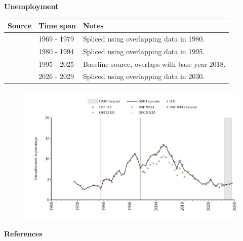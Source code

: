 \documentclass[12pt,a4paper,landscape]{article}
\begin{document}
\begin{adjustbox}{max totalsize={\paperwidth}{\paperheight},center}
\begin{minipage}[t][\textheight][t]{\textwidth}
\vspace*{0.5cm}
{}
\begin{center}
{\Large\bfseries Unemployment}
\end{center}
\vspace{0.5cm}
\begin{table}[H]
\centering
\small
\begin{tabular}{|l|l|l|}
\hline
\textbf{Source} & \textbf{Time span} & \textbf{Notes} \\
\hline
\rowcolor{white}\cite{IMF_IFS}& 1969 - 1979 &Spliced using overlapping data in 1980. \\
\rowcolor{lightgray}\cite{IMF_WEO}& 1980 - 1994 &Spliced using overlapping data in 1995. \\
\rowcolor{white}\cite{OECD_EO}& 1995 - 2025 &Baseline source, overlaps with base year 2018. \\
\rowcolor{lightgray}\cite{IMF_WEO_forecast}& 2026 - 2029 &Spliced using overlapping data in 2030. \\
\hline
\end{tabular}
\end{table}
\begin{figure}[H]
\centering
\includegraphics[width=\textwidth,height=0.6\textheight,keepaspectratio]{graphs/ISR_unemp.pdf}
\end{figure}
\end{minipage}
\end{adjustbox}
{}
\begin{center}
{\Large\bfseries References}
\end{center}
\small


\end{document}
